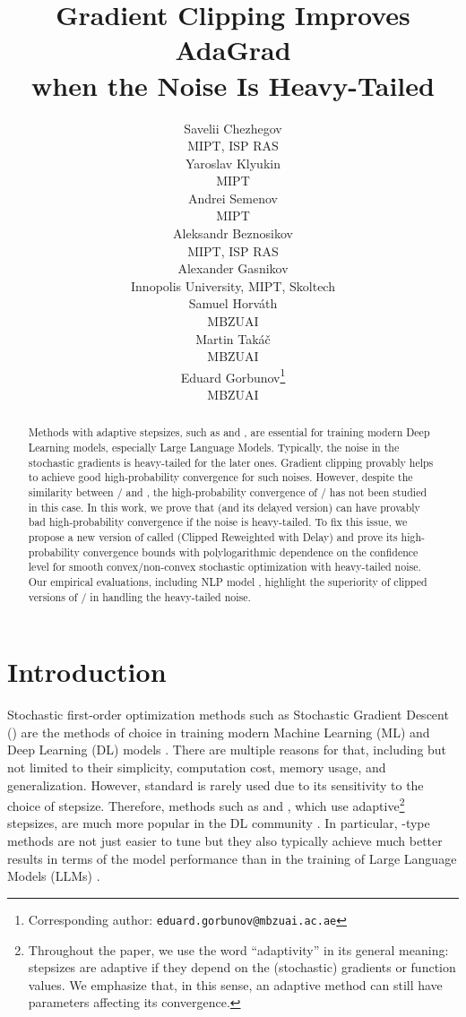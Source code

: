 \documentclass{article}
\title{Gradient Clipping Improves AdaGrad\\ when the Noise Is Heavy-Tailed}
\author{%
  Savelii Chezhegov \\
  MIPT, ISP RAS \\
  \And
  Yaroslav Klyukin\\
  MIPT\\
  \And
  Andrei Semenov\\
  MIPT\\
  \And
  Aleksandr Beznosikov\\
  MIPT, ISP RAS\\
  \And
  Alexander Gasnikov\\
  Innopolis University, MIPT, Skoltech\\
  \And
  Samuel Horv\'ath\\
  MBZUAI\\
  \And
  Martin Tak\'a\v{c}\\
  MBZUAI\\
  \And
  Eduard Gorbunov\thanks{Corresponding author: \texttt{eduard.gorbunov@mbzuai.ac.ae}}\\
  MBZUAI
}
\begin{document}
\maketitle
\begin{abstract}
  Methods with adaptive stepsizes, such as  and , are essential for training modern Deep Learning models, especially Large Language Models. Typically, the noise in the stochastic gradients is heavy-tailed for the later ones. Gradient clipping provably helps to achieve good high-probability convergence for such noises. However, despite the similarity between / and , the high-probability convergence of / has not been studied in this case. In this work, we prove that  (and its delayed version) can have provably bad high-probability convergence if the noise is heavy-tailed. To fix this issue, we propose a new version of  called  (Clipped Reweighted  with Delay) and prove its high-probability convergence bounds with polylogarithmic dependence on the confidence level for smooth convex/non-convex stochastic optimization with heavy-tailed noise. Our empirical evaluations, including NLP model , highlight the superiority of clipped versions of / in handling the heavy-tailed noise.
\end{abstract}


\section{Introduction}\label{section:intro}

Stochastic first-order optimization methods such as Stochastic Gradient Descent () \citep{robbins1951stochastic} are the methods of choice in training modern Machine Learning (ML) and Deep Learning (DL) models \citep{shalev2014understanding, goodfellow2016deep}. There are multiple reasons for that, including but not limited to their simplicity, computation cost, memory usage, and generalization. However, standard  is rarely used due to its sensitivity to the choice of stepsize. Therefore, methods such as  \citep{streeter2010less, duchi2011adaptive} and  \citep{kingma2014adam}, which use adaptive\footnote{Throughout the paper, we use the word ``adaptivity'' in its general meaning: stepsizes are adaptive if they depend on the (stochastic) gradients or function values. We emphasize that, in this sense, an adaptive method can still have parameters affecting its convergence.} stepsizes, are much more popular in the DL community . In particular, -type methods are not just easier to tune but they also typically achieve much better results in terms of the model performance than  in the training of Large Language Models (LLMs) \citep{devlin2019bert, zhang2020adaptive}.
\end{document}
